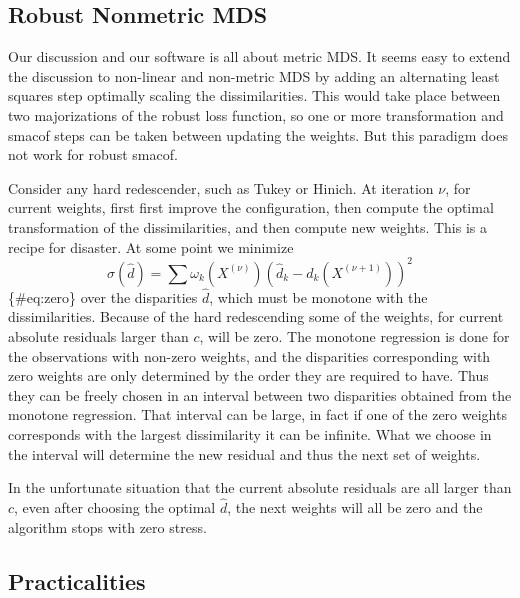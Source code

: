 \documentclass[
  12pt,
  letterpaper,
  DIV=11,
  numbers=noendperiod]{scrartcl}
\theoremstyle{definition}
\theoremstyle{plain}
\theoremstyle{plain}
\theoremstyle{plain}
\theoremstyle{definition}
\theoremstyle{remark}
\begin{document}
\subsection{Robust Nonmetric MDS}\label{robust-nonmetric-mds}

Our discussion and our software is all about metric MDS. It seems easy
to extend the discussion to non-linear and non-metric MDS by adding an
alternating least squares step optimally scaling the dissimilarities.
This would take place between two majorizations of the robust loss
function, so one or more transformation and smacof steps can be taken
between updating the weights. But this paradigm does not work for robust
smacof.

Consider any hard redescender, such as Tukey or Hinich. At iteration
\(\nu\), for current weights, first first improve the configuration,
then compute the optimal transformation of the dissimilarities, and then
compute new weights. This is a recipe for disaster. At some point we
minimize \[
\sigma(\hat d)=\sum \omega_k(X^{(\nu)})(\hat d_k-d_k(X^{(\nu+1)}))^2
\]\{\#eq:zero\} over the disparities \(\hat d\), which must be monotone
with the dissimilarities. Because of the hard redescending some of the
weights, for current absolute residuals larger than \(c\), will be zero.
The monotone regression is done for the observations with non-zero
weights, and the disparities corresponding with zero weights are only
determined by the order they are required to have. Thus they can be
freely chosen in an interval between two disparities obtained from the
monotone regression. That interval can be large, in fact if one of the
zero weights corresponds with the largest dissimilarity it can be
infinite. What we choose in the interval will determine the new residual
and thus the next set of weights.

In the unfortunate situation that the current absolute residuals are all
larger than \(c\), even after choosing the optimal \(\hat d\), the next
weights will all be zero and the algorithm stops with zero stress.

\subsection{Practicalities}\label{practicalities}
\end{document}
